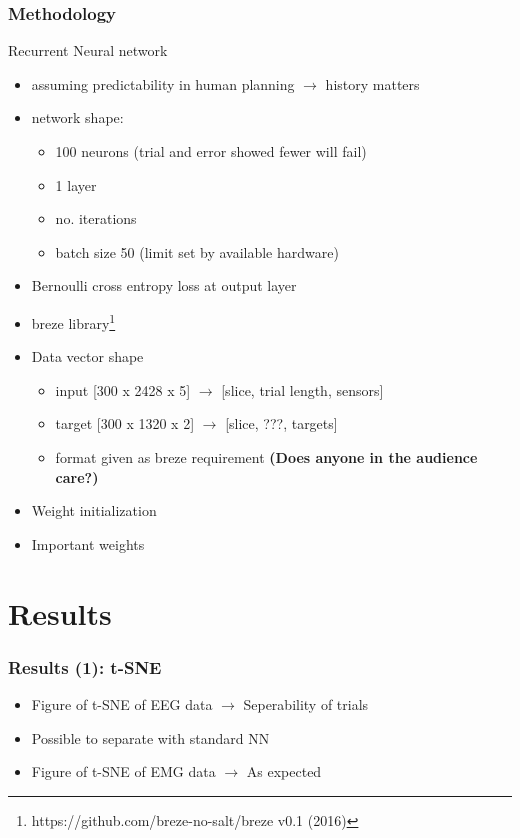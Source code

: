 \documentclass{beamer}
\begin{document}
\begin{frame}
\frametitle{Methodology}
Recurrent Neural network
\begin{itemize}
    \item assuming predictability in human planning $\rightarrow$ history matters
    \item network shape:
    \begin{itemize}
        \item 100 neurons (trial and error showed fewer will fail)
        \item 1 layer
        \item no. iterations
        \item batch size 50 (limit set by available hardware)
    \end{itemize}
    \item Bernoulli cross entropy loss at output layer
    \item breze library\footnote{https://github.com/breze-no-salt/breze v0.1 (2016)} 
    \item Data vector shape
    \begin{itemize}
        \item input  [300 x 2428 x 5] $\rightarrow$ [slice, trial length, sensors]
        \item target [300 x 1320 x 2] $\rightarrow$ [slice, ???, targets]
        \item format given as breze requirement \textbf{(Does anyone in the audience care?)}
    \end{itemize}
    \item Weight initialization
    \item Important weights
\end{itemize}
\end{frame}

\section{Results}

\begin{frame}
	\frametitle{Results (1): t-SNE}
	\begin{itemize}
		\item Figure of t-SNE of EEG data $\rightarrow$ Seperability of trials
		\item Possible to separate with standard NN
		\item Figure of t-SNE of EMG data $\rightarrow$ As expected
	\end{itemize}
\end{frame}
\end{document}
